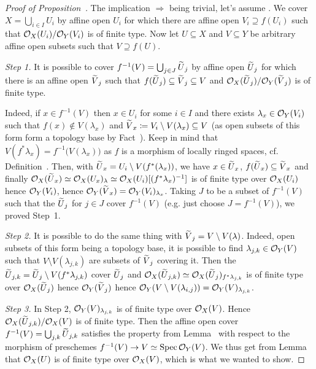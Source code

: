 \documentclass[a4paper,parskip=half,numbers=enddot, DIV=12]{scrreprt}
\begin{document}
\begin{proof}[Proof of Proposition~]
    The implication  $\Rightarrow$  being trivial, let's assume . We cover $X=\bigcup_{i\in I}U_i$ by affine open $U_i$ for which there are affine open $V_i\supseteq f(U_i)$ such that $\mathcal{O}_X(U_i)/\mathcal{O}_Y(V_i)$ is of finite type. Now let $U\subseteq X$ and $V\subseteq Y$ be arbitrary affine open subsets such that $V\supseteq f(U)$.
     
     \emph{Step 1.} It is possible to cover $f^{-1}(V)=\bigcup_{j\in J}\snake U_j$ by affine open $\snake U_j$ for which there is an affine open $\snake V_j$ such that $f(\snake U_j) \subseteq \snake V_j\subseteq V$ and $\Oo_X(\snake U_j)/\Oo_Y(\snake V_j)$ is of finite type. 
     
     Indeed, if $x\in f^{-1}(V)$ then $x\in U_i$ for some $i\in I$ and there exists $\lambda_x \in \mathcal{O}_Y(V_i)$ such that $f(x)\not\in V(\lambda_x)$ and $\snake V_x \coloneqq V_i\setminus V(\lambda_x) \subseteq V$ (as open subsets of this form form a topology base by Fact~). Keep in mind that $V(f^*\lambda_x)=f^{-1}\big(V(\lambda_x)\big)$ as $f$ is a morphism of locally ringed spaces, cf. Definition~. Then, with $\snake U_x = U_i\setminus V(f^*(\lambda_x))$, we have $x\in\snake U_x$, $f(\snake U_x)\subseteq \snake V_x$ and finally $\Oo_X(\snake U_x)\simeq \Oo_X(U_x)_\lambda\simeq\Oo_X(U_i)[(f^*\lambda_x)^{-1}]$ is of finite type over $\mathcal{O}_X(U_i)$ hence $\mathcal{O}_Y(V_i)$, hence $\Oo_Y(\snake V_x)=\Oo_Y(V_i)_{\lambda_x}$. Taking $J$ to be a subset of $f^{-1}(V)$ such that the $\snake U_j$ for $j\in J$ cover $f^{-1}(V)$ (e.g. just choose $J=f^{-1}(V)$), we proved Step~1.
     
     \emph{Step 2.} It is possible to do the same thing with $\snake V_j= V\setminus V(\lambda)$. Indeed, open subsets of this form being a topology base, it is possible to find $\lambda_{j,k}\in \mathcal{O}_Y(V)$ such that $V\setminus V(\lambda_{j,k})$ are subsets of $\snake V_j$ covering it. Then the $\snake U_{j,k} = \snake U_j\setminus V(f^*\lambda_{j,k})$ cover $\snake U_j$ and $\Oo_X(\snake U_{j,k}) \simeq \Oo_X(\snake U_j)_{f^*\lambda_{j,k}}$ is of finite type over $\Oo_X(\snake U_j)$ hence $\Oo_Y(\snake V_j)$ hence $\mathcal{O}_Y(V\setminus V(\lambda_{i,j}))=\mathcal{O}_Y(V)_{\lambda_{j,k}}$.
     
     \emph{Step 3.} In Step 2, $\mathcal{O}_Y(V)_{\lambda_{j,k}}$ is of finite type over $\mathcal{O}_X(V)$. Hence $\Oo_X(\snake U_{j,k})/\Oo_X(V)$ is of finite type. Then the affine open cover $f^{-1}(V)=\bigcup_{j,k}\smash{\snake U}_{j,k}$ satisfies the property  from Lemma~ with respect to the morphism of preschemes $f^{-1}(V)\morphism V\simeq\Spec\Oo_Y(V)$. We thus get from Lemma~ that $\mathcal{O}_X(U)$ is of finite type over $\mathcal{O}_X(V)$, which is what we wanted to show.
\end{proof}
\end{document}
